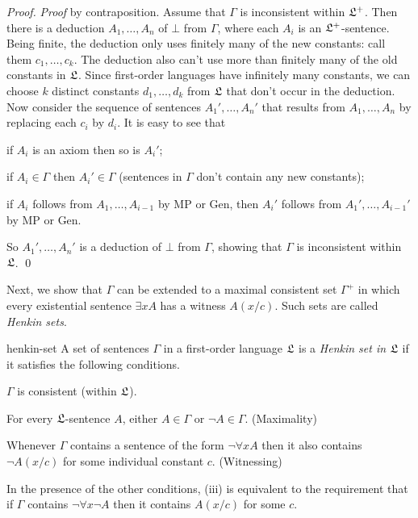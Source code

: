 \begin{proof}
  \emph{Proof} by contraposition.
  Assume that $\Gamma$ is inconsistent within $\mathfrak{L}^{+}$.
  Then there is a deduction $A_{1},\ldots,A_{n}$ of $\bot$ from $\Gamma$,
  where each $A_{i}$ is an $\mathfrak{L}^{+}$-sentence.
  Being finite,
  the deduction only uses finitely many of the new constants:
  call them $c_{1},\ldots,c_{k}$.
  The deduction also can't use more than finitely many of the old constants in $\mathfrak{L}$.
  Since first-order languages have infinitely many constants,
  we can choose $k$ distinct constants $d_{1},\ldots,d_{k}$ from $\mathfrak{L}$
  that don't occur in the deduction.
  Now consider the sequence of sentences $A_{1}',\ldots,A_{n}'$ that results from
  $A_{1},\ldots,A_{n}$ by replacing each $c_{i}$ by $d_{i}$.
  It is easy to see that
  \begin{enumerate*}
    \item[(i)] if $A_{i}$ is an axiom then so is $A_{i}'$;
    \item[(ii)] if $A_{i} \in \Gamma$ then $A_{i}' \in \Gamma$
      (sentences in $\Gamma$ don't contain any new constants);
    \item[(iii)] if $A_{i}$ follows from $A_{1},\ldots,A_{i-1}$ by MP or Gen,
      then $A_{i}'$ follows from $A_{1}',\ldots,A_{i-1}'$ by MP or Gen.
  \end{enumerate*}
  So $A_{1}',\ldots,A_{n}'$ is a deduction of $\bot$ from $\Gamma$,
  showing that $\Gamma$ is inconsistent within $\mathfrak{L}$.
  \qed
\end{proof}

Next,
we show that
$\Gamma$ can be extended to a maximal consistent set $\Gamma^{+}$ in which
every existential sentence $\exists x A$ has a witness $A(x/c)$.
Such sets are called \emph{Henkin sets}.

\begin{definition}{}{henkin-set}
  A set of sentences $\Gamma$ in a first-order language $\mathfrak{L}$ is a \emph{Henkin set in $\mathfrak{L}$} if it satisfies the following conditions.
  \begin{cenumerate}
    \item[(i)] $\Gamma$ is consistent (within $\mathfrak{L}$).
    \item[(ii)] For every $\mathfrak{L}$-sentence $A$, either $A \in \Gamma$ or $\neg A \in \Gamma$. (Maximality)
    \item[(iii)] Whenever $\Gamma$ contains a sentence of the form $\neg \forall x A$
    then it also contains $\neg A(x/c)$ for some individual constant $c$. (Witnessing)
  \end{cenumerate}
\end{definition}
\noindent%
In the presence of the other conditions,
(iii) is equivalent to the requirement that
if $\Gamma$ contains $\neg \forall x \neg A$
then it contains $A(x/c)$ for some $c$.

